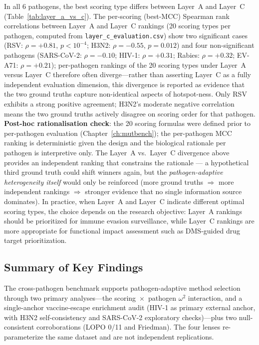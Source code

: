 In all 6 pathogens, the best scoring type differs between Layer~A and Layer~C (Table~\ref{tab:layer_a_vs_c}). The per-scoring (best-MCC) Spearman rank correlations between Layer~A and Layer~C rankings (20 scoring types per pathogen, computed from \texttt{layer\_c\_evaluation.csv}) show two significant cases (RSV: $\rho = +0.81$, $p < 10^{-4}$; H3N2: $\rho = -0.55$, $p = 0.012$) and four non-significant pathogens (SARS-CoV-2: $\rho = -0.10$; HIV-1: $\rho = +0.31$; Rabies: $\rho = +0.32$; EV-A71: $\rho = +0.21$); per-pathogen rankings of the 20 scoring types under Layer~A versus Layer~C therefore often diverge---rather than asserting Layer~C as a fully independent evaluation dimension, this divergence is reported as evidence that the two ground truths capture non-identical aspects of hotspot-ness. Only RSV exhibits a strong positive agreement; H3N2's moderate negative correlation means the two ground truths actively disagree on scoring order for that pathogen. \textbf{Post-hoc rationalisation check}: the 20 scoring formulas were defined prior to per-pathogen evaluation (Chapter~\ref{ch:mutbench}); the per-pathogen MCC ranking is deterministic given the design and the biological rationale per pathogen is interpretive only. The Layer~A vs.\ Layer~C divergence above provides an independent ranking that constrains the rationale --- a hypothetical third ground truth could shift winners again, but the \emph{pathogen-adaptive heterogeneity itself} would only be reinforced (more ground truths $\Rightarrow$ more independent rankings $\Rightarrow$ stronger evidence that no single information source dominates).
In practice, when Layer~A and Layer~C indicate different optimal scoring types, the choice depends on the research objective: Layer~A rankings should be prioritized for immune evasion surveillance, while Layer~C rankings are more appropriate for functional impact assessment such as DMS-guided drug target prioritization.

\subsection{Summary of Key Findings}
\label{subsec:pahd_motivation_summary}

The cross-pathogen benchmark supports pathogen-adaptive method selection through two primary analyses---the scoring~$\times$~pathogen $\omega^2$ interaction, and a single-anchor vaccine-escape enrichment audit (HIV-1 as primary external anchor, with H3N2 self-consistency and SARS-CoV-2 exploratory checks)---plus two null-consistent corroborations (LOPO 0/11 and Friedman). The four lenses re-parameterize the same dataset and are not independent replications.

